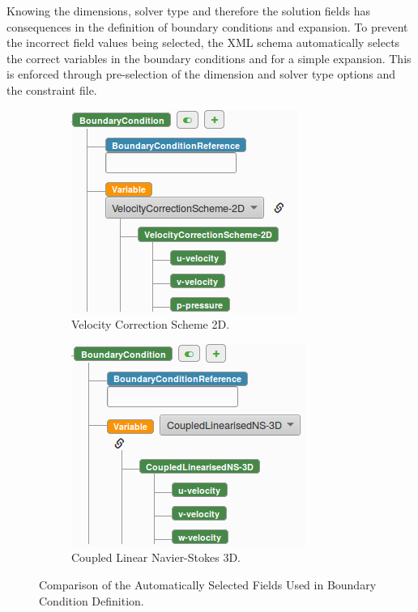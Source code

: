 \documentclass[11pt, a4paper]{report}
\begin{document}
Knowing the dimensions, solver type and therefore the solution fields has consequences in the definition of boundary conditions and expansion. To prevent the incorrect field values being selected, the XML schema automatically selects the correct variables in the boundary conditions and for a simple expansion. This is enforced through pre-selection of the dimension and solver type options and the constraint file.

\begin{figure}[!htb]
\centering
\begin{subfigure}{.5\textwidth}
  \centering
  \includegraphics[width=.9\linewidth]{VCS_2D}
  \caption{Velocity Correction Scheme 2D.}
  \label{fig:vcs2d}
\end{subfigure}%
\begin{subfigure}{.5\textwidth}
  \centering
  \includegraphics[width=.9\linewidth]{coupledLinear3D}
  \caption{Coupled Linear Navier-Stokes 3D.}
  \label{fig:coupledlinear3d}
\end{subfigure}
\caption{Comparison of the Automatically Selected Fields Used in Boundary Condition Definition.}
\label{fig:implicit_constraints}
\end{figure}
\end{document}
